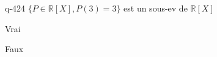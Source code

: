 \begin{truefalse}{q-424}
$\{ P \in \mathbb R[X], P(3)=3\}$ est un sous-ev de $\mathbb R[X]$
\item Vrai
\item* Faux
\end{truefalse}

